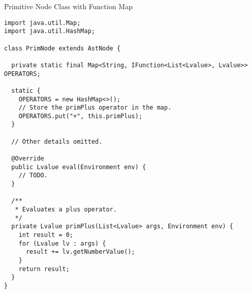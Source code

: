 \begin{cl}{Primitive Node Class with Function Map}
\begin{lstlisting}[language=MyJava]
import java.util.Map;
import java.util.HashMap;

class PrimNode extends AstNode {
  
  private static final Map<String, IFunction<List<Lvalue>, Lvalue>> OPERATORS;
  
  static {
    OPERATORS = new HashMap<>();
    // Store the primPlus operator in the map.
    OPERATORS.put("+", this.primPlus);
  }

  // Other details omitted.

  @Override
  public Lvalue eval(Environment env) {
    // TODO.
  }

  /**
   * Evaluates a plus operator.
   */
  private Lvalue primPlus(List<Lvalue> args, Environment env) {
    int result = 0;
    for (Lvalue lv : args) {
      result += lv.getNumberValue();
    }
    return result;
  }
}
\end{lstlisting}
\end{cl}

